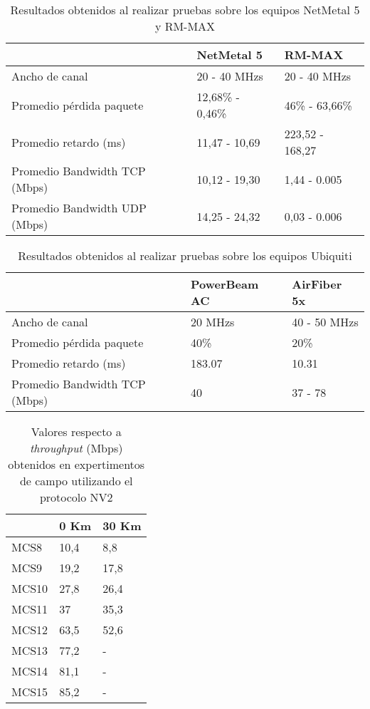\begin{table}[H]
	\begin{center}
		\begin{tabular}{|l|l|l|}
			\hline
			 & NetMetal 5 & RM-MAX\\
			\hline
            Ancho de canal & 20 - 40 MHzs & 20 - 40 MHzs\\
			\hline 
		Promedio pérdida paquete  & 12,68\% - 0,46\% & 46\% - 63,66\% \\ \hline
		Promedio retardo (ms) & 11,47 - 10,69 & 223,52 - 168,27 \\ \hline
		Promedio Bandwidth TCP (Mbps) & 10,12 - 19,30  & 1,44 - 0.005  \\ \hline
		Promedio Bandwidth UDP (Mbps) & 14,25 - 24,32  & 0,03 - 0.006  \\ \hline
		\end{tabular}
	\end{center}
	\caption{Resultados obtenidos al realizar pruebas sobre los equipos NetMetal 5 y RM-MAX}
	\label{table:pruebasEquipos}
\end{table}

\begin{table}[H]
	\begin{center}
		\begin{tabular}{|l|l|l|}
			\hline
			 & PowerBeam AC  & AirFiber 5x\\
			\hline
            Ancho de canal & 20 MHzs & 40 - 50 MHzs\\
			\hline 
		Promedio pérdida paquete  & 40\% & 20\% \\ \hline
		Promedio retardo (ms) & 183.07  & 10.31 \\ \hline
		Promedio Bandwidth TCP (Mbps) & 40  & 37 - 78 \\  \hline
		\end{tabular}
	\end{center}
	\caption{Resultados obtenidos al realizar pruebas sobre los equipos Ubiquiti}
	\label{table:pruebasEquiposUbiquiti}
\end{table}

\begin{table}[H]
	\begin{center}
		\begin{tabular}{|l|l|l|}
			\hline
			 &  0 Km  & 30 Km\\ \hline
            MCS8 & 10,4 & 8,8 \\ \hline 
		  MCS9 & 19,2 & 17,8 \\ \hline
		  MCS10 & 27,8 & 26,4 \\ \hline
		  MCS11 & 37 & 35,3 \\ \hline
		  MCS12 & 63,5 & 52,6 \\ \hline
		  MCS13 & 77,2 & - \\ \hline
		  MCS14 & 81,1 & - \\ \hline
		  MCS15 & 85,2 & - \\ \hline
		\end{tabular}
	\end{center}
	\caption{Valores respecto a \textit{throughput} (Mbps) obtenidos en expertimentos de campo utilizando el protocolo NV2}
	\label{table:pruebasNV2campo}
\end{table}

